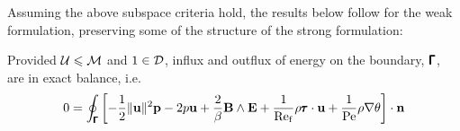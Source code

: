     \line
    
    Assuming the above subspace criteria hold, the results below follow for the weak formulation, preserving some of the structure of the strong formulation:

    \begin{theorem}
        Provided $\mathcal{U}  \leqslant  \mathcal{M}$ and $1  \in  \mathcal{D}$, influx and outflux  of energy on the boundary, $\pmb{\mathsf{\Gamma}}$, are in exact balance, i.e.
        \begin{equation}
            0  =  \oint_{\pmb{\mathsf{\Gamma}}}\left[- \frac{1}{2}\|\mathbf{u}\|^{2}\mathbf{p} - 2p\mathbf{u} + \frac{2}{\beta}\mathbf{B}\wedge\mathbf{E} + \frac{1}{\mathrm{Re}_{\mathrm{f}}}\rho\pmb{\mathsf{\tau}}\cdot\mathbf{u} + \frac{1}{\mathrm{Pe}}\rho\nabla\theta\right]\cdot\mathbf{n}
        \end{equation}
    \end{theorem}
